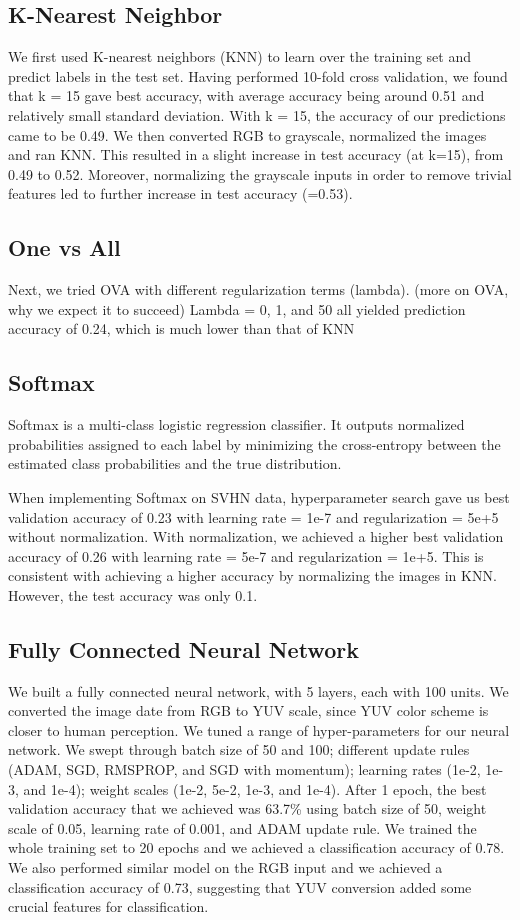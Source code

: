 \documentclass[12pt]{article}
\begin{document}
\subsection{K-Nearest Neighbor}
\indent \indent We first used K-nearest neighbors (KNN) to learn over the training set and predict labels in the test set. Having performed 10-fold cross validation, we found that k = 15 gave best accuracy, with average accuracy being around 0.51 and relatively small standard deviation. With k = 15, the accuracy of our predictions came to be 0.49. We then converted RGB to grayscale, normalized the images and ran KNN. This resulted in a slight increase in test accuracy (at k=15), from 0.49 to 0.52. Moreover, normalizing the grayscale inputs in order to remove trivial features led to further increase in test accuracy (=0.53).

\subsection{One vs All}
\indent \indent Next, we tried OVA with different regularization terms (lambda). 
(more on OVA, why we expect it to succeed)
Lambda = 0, 1, and 50 all yielded prediction accuracy of 0.24, which is much lower than that of KNN 

\subsection{Softmax}
\indent \indent Softmax is a multi-class logistic regression classifier. It outputs normalized probabilities assigned to each label by minimizing the cross-entropy between the estimated class probabilities and the true distribution. 

 \indent When implementing Softmax on SVHN data, hyperparameter search gave us best validation accuracy of 0.23 with learning rate = 1e-7 and regularization = 5e+5 without normalization. With normalization, we achieved a higher best validation accuracy of 0.26 with learning rate = 5e-7 and regularization = 1e+5. This is consistent with achieving a higher accuracy by normalizing the images in KNN. However, the test accuracy was only 0.1.

\subsection{Fully Connected Neural Network}
\indent \indent We built a fully connected neural network, with 5 layers, each with 100 units. We converted the image date from RGB to YUV scale, since YUV color scheme is closer to human perception. We tuned a range of hyper-parameters for our neural network. We swept through batch size of 50 and 100; different update rules (ADAM, SGD, RMSPROP, and SGD with momentum); learning rates (1e-2, 1e-3, and 1e-4); weight scales (1e-2, 5e-2, 1e-3, and 1e-4). After 1 epoch, the best validation accuracy that we achieved was 63.7\% using batch size of 50, weight scale of 0.05, learning rate of 0.001, and ADAM update rule. We trained the whole training set to 20 epochs and we achieved a classification accuracy of 0.78. We also performed similar model on the RGB input and we achieved a classification accuracy of 0.73, suggesting that YUV conversion added some crucial features for classification.
\end{document}
